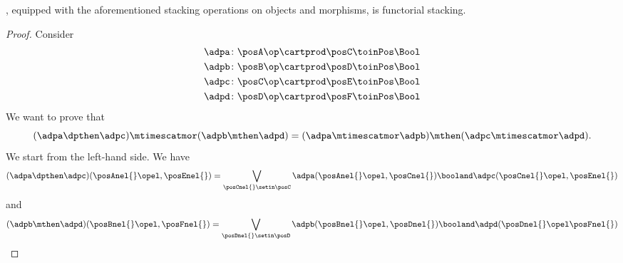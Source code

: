\begin{lemma}
    \DPL, equipped with the aforementioned stacking operations on objects and morphisms, is functorial stacking.
\end{lemma}

\begin{proof}
    Consider
    \begin{equation}
        \begin{aligned}
            \adpa\colon \posA\op\cartprod \posC & \toinPos \Bool \\
            \adpb\colon \posB\op\cartprod \posD & \toinPos \Bool \\
            \adpc\colon \posC\op\cartprod \posE & \toinPos \Bool \\
            \adpd\colon \posD\op\cartprod \posF & \toinPos \Bool
        \end{aligned}
    \end{equation}
    We want to prove that
    \begin{equation}
        (\adpa \dpthen \adpc)
        \mtimescatmor (\adpb \mthen \adpd)=(\adpa \mtimescatmor \adpb) \mthen (\adpc \mtimescatmor \adpd).
    \end{equation}
    We start from the left-hand side.
    We have
    \begin{equation}
        (\adpa \dpthen \adpc)(\posAnel{}\opel,\posEnel{})
        =\bigvee_{\posCnel{}\setin \posC}
        \adpa(\posAnel{}\opel, \posCnel{}) \booland \adpc(\posCnel{}\opel,\posEnel{})
    \end{equation}
    and
    \begin{equation}
        \begin{aligned}
            (\adpb \mthen \adpd)(\posBnel{}\opel,\posFnel{})
            =\bigvee_{\posDnel{}\setin \posD}
            \adpb(\posBnel{}\opel, \posDnel{}) \booland \adpd(\posDnel{}\opel\posFnel{})
        \end{aligned}

\end{equation}
\end{proof}
